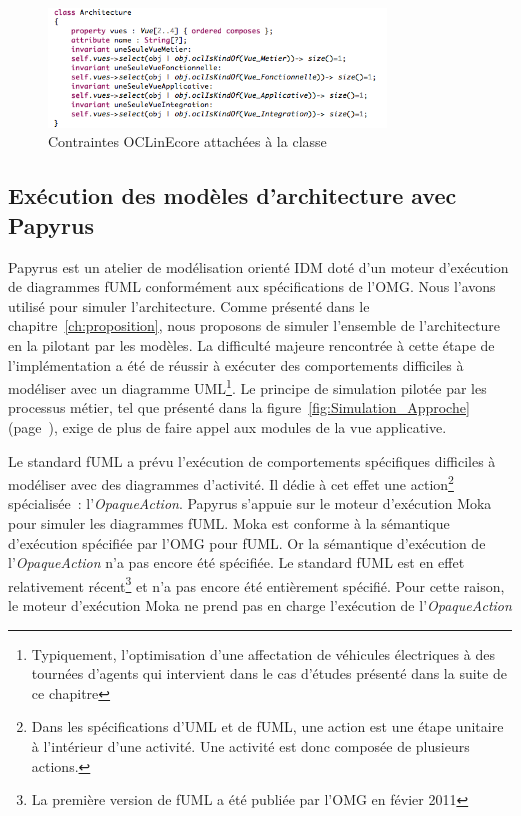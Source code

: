     \begin{figure}[!htbp]
      \centering
      \includegraphics[width=0.8\textwidth]{figures/5_implementation/ocl_in_ecore_vue.png}
     \caption{Contraintes OCLinEcore attachées à la classe \protect{} }
     \label{fig:contraintes_ocl_architecture}
    \end{figure}

    \subsection{Exécution des modèles d’architecture avec Papyrus}
    \label{sec:opaque_action_papyrus}

    Papyrus est un atelier de modélisation orienté IDM doté d'un moteur
    d'exécution de diagrammes fUML conformément aux spécifications de l'OMG.
    Nous l'avons utilisé pour simuler l'architecture. Comme présenté dans le
    chapitre~\ref{ch:proposition}, nous proposons de simuler l'ensemble de
    l'architecture en la pilotant par les modèles.  La difficulté majeure
    rencontrée à cette étape de l'implémentation a été de réussir à exécuter des
    comportements difficiles à modéliser avec un diagramme
    UML\footnote{Typiquement, l'optimisation d'une affectation de véhicules
    électriques à des tournées d'agents qui intervient dans le cas d'études
    présenté dans la suite de ce chapitre}. Le principe de simulation pilotée
    par les processus métier, tel que présenté dans la
    figure~\ref{fig:Simulation_Approche}
    (page~\pageref{fig:Simulation_Approche}), exige de plus de faire appel aux
    modules de la vue applicative.
    
    Le standard fUML a prévu l'exécution de comportements spécifiques difficiles
    à modéliser avec  des diagrammes d'activité. Il dédie à cet effet une
    action\footnote{Dans les spécifications d'UML et de fUML, une action est une étape
    unitaire à l'intérieur d'une activité. Une activité est donc composée de
    plusieurs actions.} spécialisée~: l'\emph{OpaqueAction}. Papyrus s'appuie
    sur le moteur d'exécution Moka pour simuler les diagrammes fUML. Moka est
    conforme à la sémantique d'exécution spécifiée par l'OMG pour fUML. Or la
    sémantique d'exécution de l'\emph{OpaqueAction} n'a pas encore été
    spécifiée. Le standard fUML est en effet relativement récent\footnote{La
    première version de fUML a été publiée par l'OMG en févier 2011} et n'a pas
    encore été entièrement spécifié. Pour cette raison, le moteur d'exécution
    Moka ne prend pas en charge l'exécution de l'\emph{OpaqueAction}

